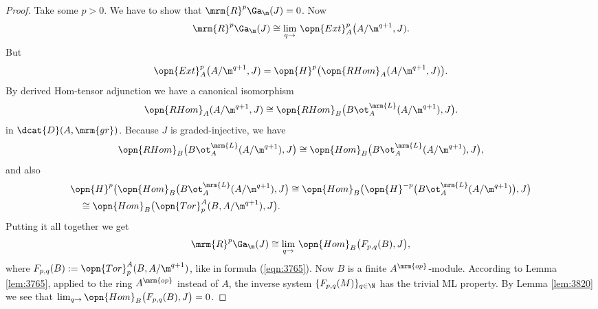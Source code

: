 \begin{proof}
Take some $p > 0$. We have to show that 
$\mrm{R}^p \Ga_{\m}(J) = 0$. 
Now 
\[ \mrm{R}^p \Ga_{\m}(J) 
\cong \lim_{q \to} \, \opn{Ext}^p_A \bigl( A / \m^{q + 1}, J) . \]
But 
\[ \opn{Ext}^p_A \bigl( A / \m^{q + 1}, J) = 
\opn{H}^p \bigl( \opn{RHom}_A ( A / \m^{q + 1}, J) \bigr) . \]
By derived Hom-tensor adjunction we have a canonical isomorphism 
\[ \opn{RHom}_A ( A / \m^{q + 1}, J) \cong 
\opn{RHom}_B \bigl( B \ot^{\mrm{L}}_{A} (A / \m^{q + 1}), J \bigr) . \]
in $\dcat{D}(A, \mrm{gr})$. Because $J$ is graded-injective, we have 
\[ \opn{RHom}_B \bigl( B \ot^{\mrm{L}}_{A} (A / \m^{q + 1}), J \bigr) \cong 
\opn{Hom}_B \bigl( B \ot^{\mrm{L}}_{A} (A / \m^{q + 1}), J \bigr) , \]
and also  
\[ \begin{aligned}
& \opn{H}^p \bigl( 
\opn{Hom}_B \bigl( B \ot^{\mrm{L}}_{A} (A / \m^{q + 1}), J \bigr) \cong
\opn{Hom}_B \bigl( \opn{H}^{-p} \bigl(
B \ot^{\mrm{L}}_{A} (A / \m^{q + 1}) \bigr), J \bigr) 
\\
& \quad \cong 
\opn{Hom}_B \bigl( \opn{Tor}_p^A (B, A / \m^{q + 1}), J \bigr) . 
\end{aligned} \]
Putting it all together we get 
\[ \mrm{R}^p \Ga_{\m}(J) \cong 
\lim_{q \to} \, \opn{Hom}_B \bigl( F_{p, q}(B) , J \bigr) , \]
where 
$F_{p, q}(B) := \opn{Tor}_p^A (B, A / \m^{q + 1})$, 
like in formula (\ref{eqn:3765}).
Now $B$ is a finite $A^{\mrm{op}}$-module. 
According to Lemma \ref{lem:3765}, applied to the ring $A^{\mrm{op}}$ instead 
of 
$A$, the inverse system 
$\{ F_{p, q}(M) \}_{q \in \N}$ 
has the trivial ML property. By Lemma \ref{lem:3820} we see that 
$\lim_{q \to} \opn{Hom}_B \bigl( F_{p, q}(B) , J \bigr) = 0$.
\end{proof}

